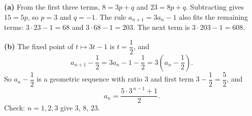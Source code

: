 \textbf{(a)} From the first three terms, $8=3p+q$ and $23=8p+q$. Subtracting gives $15=5p$, so $p=3$ and $q=-1$. The rule $a_{n+1}=3a_n-1$ also fits the remaining terms: $3\cdot23-1=68$ and $3\cdot68-1=203$. The next term is $3\cdot203-1=\boxed{608}$.

\textbf{(b)} The fixed point of $t\mapsto3t-1$ is $t=\dfrac{1}{2}$, and
\[a_{n+1}-\dfrac{1}{2}=3a_n-1-\dfrac{1}{2}=3\left(a_n-\dfrac{1}{2}\right).\]
So $a_n-\dfrac{1}{2}$ is a geometric sequence with ratio $3$ and first term $3-\dfrac{1}{2}=\dfrac{5}{2}$, and
\[a_n=\boxed{\dfrac{5\cdot3^{\,n-1}+1}{2}}.\]
Check: $n=1,2,3$ give $3$, $8$, $23$.

